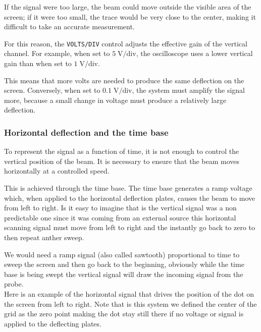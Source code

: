 \documentclass[../main.tex]{subfiles}
\begin{document}
If the signal were too large, the beam could move outside the visible area of the screen; if it were too small, the trace would be very close to the center, making it difficult to take an accurate measurement.

For this reason, the \texttt{VOLTS/DIV} control adjusts the effective gain of the vertical channel. For example, when set to $5 \; \text{V/div}$, the oscilloscope uses a lower vertical gain than when set to $1 \; \text{V/div}$. 

This means that more volts are needed to produce the same deflection on the screen.
Conversely, when set to $0.1 \; \text{V/div}$, the system must amplify the signal more, because a small change in voltage must produce a relatively large deflection.

\subsubsection{Horizontal deflection and the time base}

To represent the signal as a function of time, it is not enough to control the vertical position of the beam. It is necessary to ensure that the beam moves horizontally at a controlled speed.

This is achieved through the time base. The time base generates a ramp voltage which, when applied to the horizontal deflection plates, causes the beam to move from left to right.
Is it easy to imagine that is the vertical signal was a non predictable one since it was coming from an external source this horizontal scanning signal must move from left to right and the instantly go back to zero to then repeat anther sweep.

We would need a ramp signal (also called sawtooth) proportional to time to sweep the screen and then go back to the beginning, obviously while the time base is being swept the vertical signal will draw the incoming signal from the probe.\\

Here is an example of the horizontal signal that drives the position of the dot on the screen from left to right.
Note that is this system we defined the center of the grid as the zero point making the dot stay still there if no voltage or signal is applied to the deflecting plates.
\end{document}
